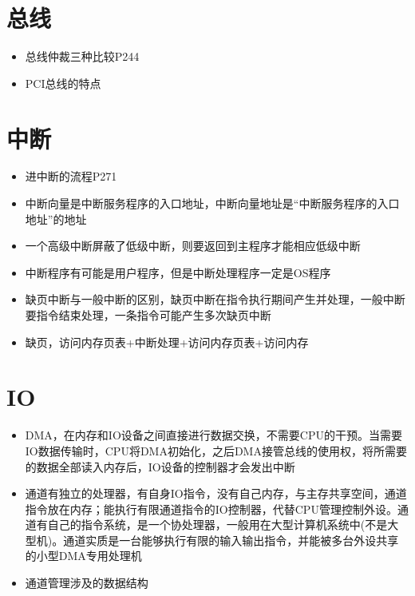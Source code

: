 \documentclass[UTF8]{ctexart}
\begin{document}
\section{总线}
\begin{itemize}
	\item 总线仲裁三种比较P244
	\item PCI总线的特点
\end{itemize}

\section{中断}
\begin{itemize}
	\item 进中断的流程P271
	\item 中断向量是中断服务程序的入口地址，中断向量地址是“中断服务程序的入口地址”的地址
	\item 一个高级中断屏蔽了低级中断，则要返回到主程序才能相应低级中断
	\item 中断程序有可能是用户程序，但是中断处理程序一定是OS程序
	\item 缺页中断与一般中断的区别，缺页中断在指令执行期间产生并处理，一般中断要指令结束处理，一条指令可能产生多次缺页中断
	\item 缺页，访问内存页表+中断处理+访问内存页表+访问内存
\end{itemize}

\section{IO}
\begin{itemize}
	\item DMA，在内存和IO设备之间直接进行数据交换，不需要CPU的干预。当需要IO数据传输时，CPU将DMA初始化，之后DMA接管总线的使用权，将所需要的数据全部读入内存后，IO设备的控制器才会发出中断
	\item 通道有独立的处理器，有自身IO指令，没有自己内存，与主存共享空间，通道指令放在内存；能执行有限通道指令的IO控制器，代替CPU管理控制外设。通道有自己的指令系统，是一个协处理器，一般用在大型计算机系统中(不是大型机)。通道实质是一台能够执行有限的输入输出指令，并能被多台外设共享的小型DMA专用处理机
	\item 通道管理涉及的数据结构
\end{itemize}
\end{document}
